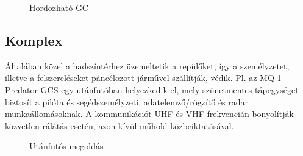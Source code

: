 \documentclass[12pt]{article}
\begin{document}
\begin{itemize}
\begin{figure}[H]
	\centering
	\caption{Hordozható GC}
	\label{fig:hord}
\end{figure}

\subsection{Komplex}
Általában közel a hadszíntérhez üzemeltetik a repül\H{o}ket, így a személyzetet, illetve a felszereléseket páncélozott járm\H{u}vel szállítják, védik.
Pl. az MQ-1 Predator GCS egy utánfutóban helyezkedik el, mely szünetmentes tápegységet biztosít a pilóta és segédszemélyzeti, adatelemz\H{o}/rögzít\H{o} és radar munkaállomásoknak. A kommunikációt UHF és VHF frekvencián bonyolítják közvetlen rálátás esetén, azon kívül m\H{u}hold közbeiktatásával.

\begin{figure}[H]
	\centering
	\caption{Utánfutós megoldás}
	\label{fig:komplex}
\end{figure}



\end{itemize}
\end{document}
